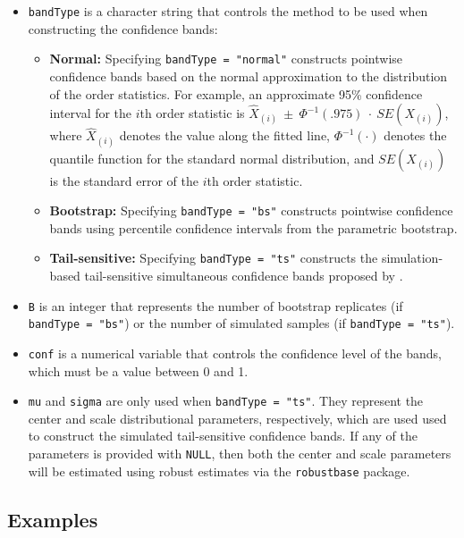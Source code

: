 \begin{itemize}
\item
  \texttt{bandType} is a character string that controls the method to be
  used when constructing the confidence bands:

  \begin{itemize}
  \tightlist
  \item
    \textbf{Normal:} Specifying \texttt{bandType\ =\ "normal"}
    constructs pointwise confidence bands based on the normal
    approximation to the distribution of the order statistics. For
    example, an approximate 95\% confidence interval for the \(i\)th
    order statistic is
    \(\widehat{X}_{(i)}~\pm~\Phi^{-1}(.975)~\cdot~SE(X_{(i)})\), where
    \(\widehat{X}_{(i)}\) denotes the value along the fitted line,
    \(\Phi^{-1}(\cdot)\) denotes the quantile function for the standard
    normal distribution, and \(SE(X_{(i)})\) is the standard error of
    the \(i\)th order statistic.
  \item
    \textbf{Bootstrap:} Specifying \texttt{bandType\ =\ "bs"} constructs
    pointwise confidence bands using percentile confidence intervals
    from the parametric bootstrap.
  \item
    \textbf{Tail-sensitive:} Specifying \texttt{bandType\ =\ "ts"}
    constructs the simulation-based tail-sensitive simultaneous
    confidence bands proposed by \citet{Aldor-Noiman2013-xw}.
  \end{itemize}
\item
  \texttt{B} is an integer that represents the number of bootstrap
  replicates (if \texttt{bandType\ =\ "bs"}) or the number of simulated
  samples (if \texttt{bandType\ =\ "ts"}).
\item
  \texttt{conf} is a numerical variable that controls the confidence
  level of the bands, which must be a value between 0 and 1.
\item
  \texttt{mu} and \texttt{sigma} are only used when
  \texttt{bandType\ =\ "ts"}. They represent the center and scale
  distributional parameters, respectively, which are used used to
  construct the simulated tail-sensitive confidence bands. If any of the
  parameters is provided with \texttt{NULL}, then both the center and
  scale parameters will be estimated using robust estimates via the
  \texttt{robustbase} package.
\end{itemize}

\FloatBarrier

\subsection{Examples}\label{examples}


